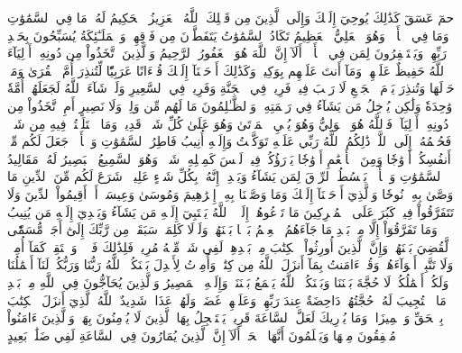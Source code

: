 حمٓ
عٓسٓقٓ
كَذَٰلِكَ يُوحِيٓ إِلَيۡكَ وَإِلَى ٱلَّذِينَ مِن قَبۡلِكَ ٱللَّهُ ٱلۡعَزِيزُ ٱلۡحَكِيمُ
لَهُۥ مَا فِي ٱلسَّمَٰوَٰتِ وَمَا فِي ٱلۡأَرۡضِۖ وَهُوَ ٱلۡعَلِيُّ ٱلۡعَظِيمُ
تَكَادُ ٱلسَّمَٰوَٰتُ يَتَفَطَّرۡنَ مِن فَوۡقِهِنَّۚ وَٱلۡمَلَـٰٓئِكَةُ يُسَبِّحُونَ بِحَمۡدِ رَبِّهِمۡ وَيَسۡتَغۡفِرُونَ لِمَن فِي ٱلۡأَرۡضِۗ أَلَآ إِنَّ ٱللَّهَ هُوَ ٱلۡغَفُورُ ٱلرَّحِيمُ
وَٱلَّذِينَ ٱتَّخَذُواْ مِن دُونِهِۦٓ أَوۡلِيَآءَ ٱللَّهُ حَفِيظٌ عَلَيۡهِمۡ وَمَآ أَنتَ عَلَيۡهِم بِوَكِيلٖ
وَكَذَٰلِكَ أَوۡحَيۡنَآ إِلَيۡكَ قُرۡءَانًا عَرَبِيّٗا لِّتُنذِرَ أُمَّ ٱلۡقُرَىٰ وَمَنۡ حَوۡلَهَا وَتُنذِرَ يَوۡمَ ٱلۡجَمۡعِ لَا رَيۡبَ فِيهِۚ فَرِيقٞ فِي ٱلۡجَنَّةِ وَفَرِيقٞ فِي ٱلسَّعِيرِ
وَلَوۡ شَآءَ ٱللَّهُ لَجَعَلَهُمۡ أُمَّةٗ وَٰحِدَةٗ وَلَٰكِن يُدۡخِلُ مَن يَشَآءُ فِي رَحۡمَتِهِۦۚ وَٱلظَّـٰلِمُونَ مَا لَهُم مِّن وَلِيّٖ وَلَا نَصِيرٍ
أَمِ ٱتَّخَذُواْ مِن دُونِهِۦٓ أَوۡلِيَآءَۖ فَٱللَّهُ هُوَ ٱلۡوَلِيُّ وَهُوَ يُحۡيِ ٱلۡمَوۡتَىٰ وَهُوَ عَلَىٰ كُلِّ شَيۡءٖ قَدِيرٞ
وَمَا ٱخۡتَلَفۡتُمۡ فِيهِ مِن شَيۡءٖ فَحُكۡمُهُۥٓ إِلَى ٱللَّهِۚ ذَٰلِكُمُ ٱللَّهُ رَبِّي عَلَيۡهِ تَوَكَّلۡتُ وَإِلَيۡهِ أُنِيبُ
فَاطِرُ ٱلسَّمَٰوَٰتِ وَٱلۡأَرۡضِۚ جَعَلَ لَكُم مِّنۡ أَنفُسِكُمۡ أَزۡوَٰجٗا وَمِنَ ٱلۡأَنۡعَٰمِ أَزۡوَٰجٗا يَذۡرَؤُكُمۡ فِيهِۚ لَيۡسَ كَمِثۡلِهِۦ شَيۡءٞۖ وَهُوَ ٱلسَّمِيعُ ٱلۡبَصِيرُ
لَهُۥ مَقَالِيدُ ٱلسَّمَٰوَٰتِ وَٱلۡأَرۡضِۖ يَبۡسُطُ ٱلرِّزۡقَ لِمَن يَشَآءُ وَيَقۡدِرُۚ إِنَّهُۥ بِكُلِّ شَيۡءٍ عَلِيمٞ
۞شَرَعَ لَكُم مِّنَ ٱلدِّينِ مَا وَصَّىٰ بِهِۦ نُوحٗا وَٱلَّذِيٓ أَوۡحَيۡنَآ إِلَيۡكَ وَمَا وَصَّيۡنَا بِهِۦٓ إِبۡرَٰهِيمَ وَمُوسَىٰ وَعِيسَىٰٓۖ أَنۡ أَقِيمُواْ ٱلدِّينَ وَلَا تَتَفَرَّقُواْ فِيهِۚ كَبُرَ عَلَى ٱلۡمُشۡرِكِينَ مَا تَدۡعُوهُمۡ إِلَيۡهِۚ ٱللَّهُ يَجۡتَبِيٓ إِلَيۡهِ مَن يَشَآءُ وَيَهۡدِيٓ إِلَيۡهِ مَن يُنِيبُ
وَمَا تَفَرَّقُوٓاْ إِلَّا مِنۢ بَعۡدِ مَا جَآءَهُمُ ٱلۡعِلۡمُ بَغۡيَۢا بَيۡنَهُمۡۚ وَلَوۡلَا كَلِمَةٞ سَبَقَتۡ مِن رَّبِّكَ إِلَىٰٓ أَجَلٖ مُّسَمّٗى لَّقُضِيَ بَيۡنَهُمۡۚ وَإِنَّ ٱلَّذِينَ أُورِثُواْ ٱلۡكِتَٰبَ مِنۢ بَعۡدِهِمۡ لَفِي شَكّٖ مِّنۡهُ مُرِيبٖ
فَلِذَٰلِكَ فَٱدۡعُۖ وَٱسۡتَقِمۡ كَمَآ أُمِرۡتَۖ وَلَا تَتَّبِعۡ أَهۡوَآءَهُمۡۖ وَقُلۡ ءَامَنتُ بِمَآ أَنزَلَ ٱللَّهُ مِن كِتَٰبٖۖ وَأُمِرۡتُ لِأَعۡدِلَ بَيۡنَكُمُۖ ٱللَّهُ رَبُّنَا وَرَبُّكُمۡۖ لَنَآ أَعۡمَٰلُنَا وَلَكُمۡ أَعۡمَٰلُكُمۡۖ لَا حُجَّةَ بَيۡنَنَا وَبَيۡنَكُمُۖ ٱللَّهُ يَجۡمَعُ بَيۡنَنَاۖ وَإِلَيۡهِ ٱلۡمَصِيرُ
وَٱلَّذِينَ يُحَآجُّونَ فِي ٱللَّهِ مِنۢ بَعۡدِ مَا ٱسۡتُجِيبَ لَهُۥ حُجَّتُهُمۡ دَاحِضَةٌ عِندَ رَبِّهِمۡ وَعَلَيۡهِمۡ غَضَبٞ وَلَهُمۡ عَذَابٞ شَدِيدٌ
ٱللَّهُ ٱلَّذِيٓ أَنزَلَ ٱلۡكِتَٰبَ بِٱلۡحَقِّ وَٱلۡمِيزَانَۗ وَمَا يُدۡرِيكَ لَعَلَّ ٱلسَّاعَةَ قَرِيبٞ
يَسۡتَعۡجِلُ بِهَا ٱلَّذِينَ لَا يُؤۡمِنُونَ بِهَاۖ وَٱلَّذِينَ ءَامَنُواْ مُشۡفِقُونَ مِنۡهَا وَيَعۡلَمُونَ أَنَّهَا ٱلۡحَقُّۗ أَلَآ إِنَّ ٱلَّذِينَ يُمَارُونَ فِي ٱلسَّاعَةِ لَفِي ضَلَٰلِۭ بَعِيدٍ
